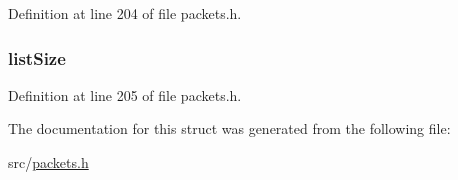 Definition at line 204 of file packets.\+h.

\hypertarget{struct_c_o_n_t_i_n_u_e___l_i_s_t___f_i_l_e_s_abfa15b3e9c94f60be2f38c77d1dbe5ae}{}
\subsubsection[{list\+Size}]{ list\+Size}\label{struct_c_o_n_t_i_n_u_e___l_i_s_t___f_i_l_e_s_abfa15b3e9c94f60be2f38c77d1dbe5ae}


Definition at line 205 of file packets.\+h.



The documentation for this struct was generated from the following file\+:\begin{DoxyCompactItemize}
\item 
src/\hyperlink{packets_8h}{packets.\+h}\end{DoxyCompactItemize}
